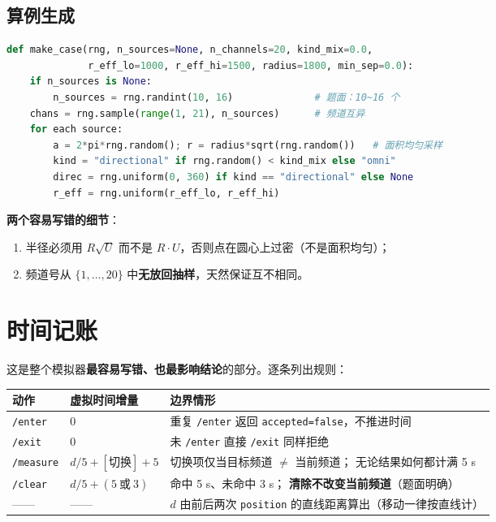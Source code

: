 \subsection{算例生成}

\begin{lstlisting}[language=Python,caption={make\_case：由种子唯一确定一局}]
def make_case(rng, n_sources=None, n_channels=20, kind_mix=0.0,
              r_eff_lo=1000, r_eff_hi=1500, radius=1800, min_sep=0.0):
    if n_sources is None:
        n_sources = rng.randint(10, 16)              # 题面：10~16 个
    chans = rng.sample(range(1, 21), n_sources)      # 频道互异
    for each source:
        a = 2*pi*rng.random(); r = radius*sqrt(rng.random())   # 面积均匀采样
        kind = "directional" if rng.random() < kind_mix else "omni"
        direc = rng.uniform(0, 360) if kind == "directional" else None
        r_eff = rng.uniform(r_eff_lo, r_eff_hi)
\end{lstlisting}

\textbf{两个容易写错的细节}：
\begin{enumerate}[leftmargin=1.8em]
  \item 半径必须用 $R\sqrt{U}$ 而不是 $R\cdot U$，否则点在圆心上过密（不是面积均匀）；
  \item 频道号从 $\{1,\dots,20\}$ 中\textbf{无放回抽样}，天然保证互不相同。
\end{enumerate}

\section{时间记账}

这是整个模拟器\textbf{最容易写错、也最影响结论}的部分。逐条列出规则：

\begin{longtable}{p{3.6cm}p{4.2cm}p{7.0cm}}
\toprule
动作 & 虚拟时间增量 & 边界情形 \\ \midrule
\endhead
\texttt{/enter} & 0 & 重复 \texttt{/enter} 返回 \texttt{accepted=false}，不推进时间 \\
\texttt{/exit} & 0 & 未 \texttt{/enter} 直接 \texttt{/exit} 同样拒绝 \\
\texttt{/measure} & $d/5 + [\text{切换}] + 5$ & 切换项仅当目标频道 $\ne$ 当前频道；
无论结果如何都计满 5 s \\
\texttt{/clear} & $d/5 + (5\ \text{或}\ 3)$ & 命中 5 s、未命中 3 s；
\textbf{清除不改变当前频道}（题面明确）\\
—— & —— & $d$ 由前后两次 \texttt{position} 的直线距离算出（移动一律按直线计）\\
\bottomrule
\end{longtable}

